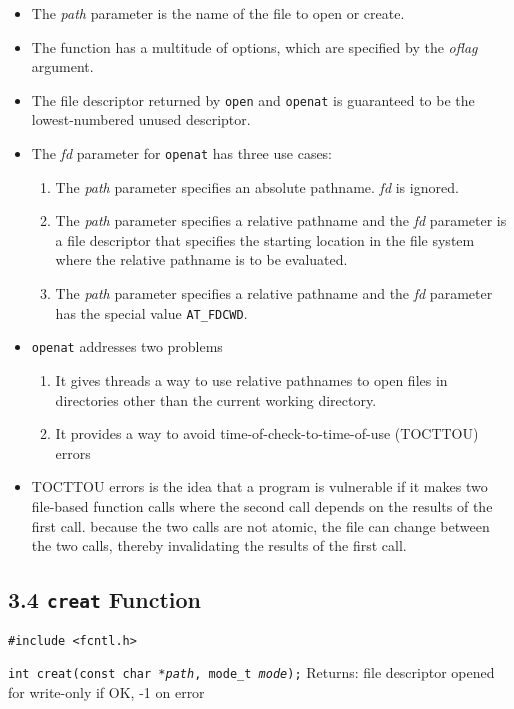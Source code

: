 \documentclass[]{article} \usepackage[all]{xy}
\newcommand{\code}{\texttt}
\begin{document}
\begin{itemize}
\item The \emph{path} parameter is the name of the file to open or create.
\item The function has a multitude of options, which are specified by the
\emph{oflag} argument.
\item The file descriptor returned by \code{open} and \code{openat} is
guaranteed to be the lowest-numbered unused descriptor.
\item The \emph{fd} parameter for \code{openat} has three use cases:
\begin{enumerate}
\item The \emph{path} parameter specifies an absolute pathname. \emph{fd} is
ignored.
\item The \emph{path} parameter specifies a relative pathname and the \emph{fd}
parameter is a file descriptor that specifies the starting location in the file
system where the relative pathname is to be evaluated.
\item The \emph{path} parameter specifies a relative pathname and the \emph{fd}
parameter has the special value \code{AT\_FDCWD}.
\end{enumerate}
\item \code{openat} addresses two problems
\begin{enumerate}
\item It gives threads a way to use relative pathnames to open files in
directories other than the current working directory.
\item It provides a way to avoid time-of-check-to-time-of-use (TOCTTOU) errors
\end{enumerate}
\item TOCTTOU errors is the idea that a program is vulnerable if it makes two
file-based function calls where the second call depends on the results of the
first call. because the two calls are not atomic, the file can change between
the two calls, thereby invalidating the results of the first call.
\end{itemize}

\subsection*{3.4 \code{creat} Function}
\code{\#include <fcntl.h>}

\code{int creat(const char *\emph{path}, mode\_t \emph{mode});}
Returns: file descriptor opened for write-only if OK, -1 on error
\end{document}

